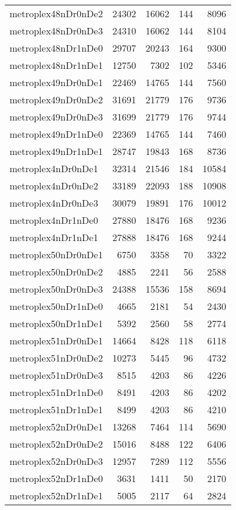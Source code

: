 \begin{longtable}{lrrrr}
metroplex48nDr0nDe2 & 24302 & 16062 & 144 & 8096 \\
metroplex48nDr0nDe3 & 24310 & 16062 & 144 & 8104 \\
metroplex48nDr1nDe0 & 29707 & 20243 & 164 & 9300 \\
metroplex48nDr1nDe1 & 12750 & 7302 & 102 & 5346 \\
metroplex49nDr0nDe1 & 22469 & 14765 & 144 & 7560 \\
metroplex49nDr0nDe2 & 31691 & 21779 & 176 & 9736 \\
metroplex49nDr0nDe3 & 31699 & 21779 & 176 & 9744 \\
metroplex49nDr1nDe0 & 22369 & 14765 & 144 & 7460 \\
metroplex49nDr1nDe1 & 28747 & 19843 & 168 & 8736 \\
metroplex4nDr0nDe1 & 32314 & 21546 & 184 & 10584 \\
metroplex4nDr0nDe2 & 33189 & 22093 & 188 & 10908 \\
metroplex4nDr0nDe3 & 30079 & 19891 & 176 & 10012 \\
metroplex4nDr1nDe0 & 27880 & 18476 & 168 & 9236 \\
metroplex4nDr1nDe1 & 27888 & 18476 & 168 & 9244 \\
metroplex50nDr0nDe1 & 6750 & 3358 & 70 & 3322 \\
metroplex50nDr0nDe2 & 4885 & 2241 & 56 & 2588 \\
metroplex50nDr0nDe3 & 24388 & 15536 & 158 & 8694 \\
metroplex50nDr1nDe0 & 4665 & 2181 & 54 & 2430 \\
metroplex50nDr1nDe1 & 5392 & 2560 & 58 & 2774 \\
metroplex51nDr0nDe1 & 14664 & 8428 & 118 & 6118 \\
metroplex51nDr0nDe2 & 10273 & 5445 & 96 & 4732 \\
metroplex51nDr0nDe3 & 8515 & 4203 & 86 & 4226 \\
metroplex51nDr1nDe0 & 8491 & 4203 & 86 & 4202 \\
metroplex51nDr1nDe1 & 8499 & 4203 & 86 & 4210 \\
metroplex52nDr0nDe1 & 13268 & 7464 & 114 & 5690 \\
metroplex52nDr0nDe2 & 15016 & 8488 & 122 & 6406 \\
metroplex52nDr0nDe3 & 12957 & 7289 & 112 & 5556 \\
metroplex52nDr1nDe0 & 3631 & 1411 & 50 & 2170 \\
metroplex52nDr1nDe1 & 5005 & 2117 & 64 & 2824 \\

\end{longtable}
